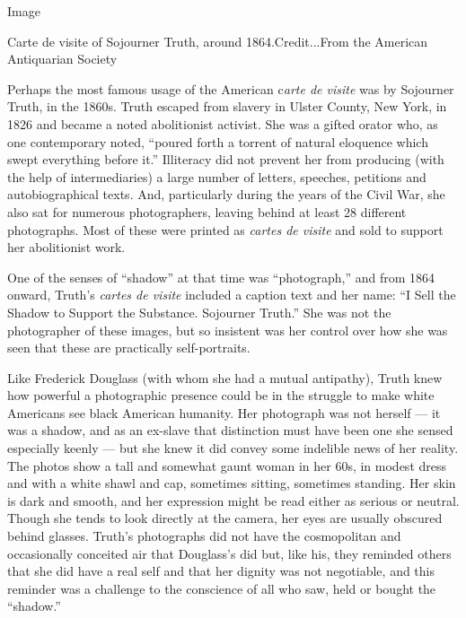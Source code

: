 Image

Carte de visite of Sojourner Truth, around 1864.Credit...From the
American Antiquarian Society

Perhaps the most famous usage of the American c\emph{arte de visite} was
by Sojourner Truth, in the 1860s. Truth escaped from slavery in Ulster
County, New York, in 1826 and became a noted abolitionist activist. She
was a gifted orator who, as one contemporary noted, ``poured forth a
torrent of natural eloquence which swept everything before it.''
Illiteracy did not prevent her from producing (with the help of
intermediaries) a large number of letters, speeches, petitions and
autobiographical texts. And, particularly during the years of the Civil
War, she also sat for numerous photographers, leaving behind at least 28
different photographs. Most of these were printed as \emph{cartes de
visite} and sold to support her abolitionist work.

One of the senses of ``shadow'' at that time was ``photograph,'' and
from 1864 onward, Truth's \emph{cartes de visite} included a caption
text and her name: ``I Sell the Shadow to Support the Substance.
Sojourner Truth.'' She was not the photographer of these images, but so
insistent was her control over how she was seen that these are
practically self-portraits.

Like Frederick Douglass (with whom she had a mutual antipathy), Truth
knew how powerful a photographic presence could be in the struggle to
make white Americans see black American humanity. Her photograph was not
herself --- it was a shadow, and as an ex-slave that distinction must
have been one she sensed especially keenly --- but she knew it did
convey some indelible news of her reality. The photos show a tall and
somewhat gaunt woman in her 60s, in modest dress and with a white shawl
and cap, sometimes sitting, sometimes standing. Her skin is dark and
smooth, and her expression might be read either as serious or neutral.
Though she tends to look directly at the camera, her eyes are usually
obscured behind glasses. Truth's photographs did not have the
cosmopolitan and occasionally conceited air that Douglass's did but,
like his, they reminded others that she did have a real self and that
her dignity was not negotiable, and this reminder was a challenge to the
conscience of all who saw, held or bought the ``shadow.''

